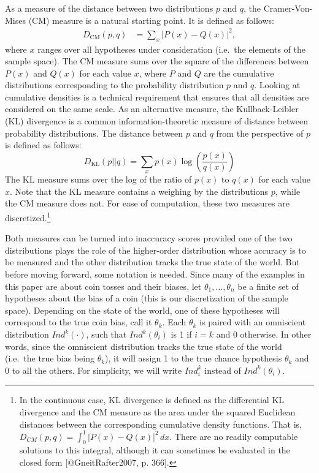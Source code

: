 \documentclass[
  letterpaper,
  DIV=11,
  numbers=noendperiod]{scrartcl}
\begin{document}
As a measure of the distance between two distributions \(p\) and \(q\),
the Cramer-Von-Mises (CM) measure is a natural starting point. It is
defined as follows: \begin{align*}
D_{\text{CM}}(p,q) & = \sum_{x} \vert P(x) - Q(x)\vert^2, 
\end{align*} \noindent where \(x\) ranges over all hypotheses under
consideration (i.e.~the elements of the sample space). The CM measure
sums over the square of the differences between \(P(x)\) and \(Q(x)\)
for each value \(x\), where \(P\) and \(Q\) are the cumulative
distributions corresponding to the probability distribution \(p\) and
\(q\). Looking at cumulative densities is a technical requirement that
ensures that all densities are considered on the same scale. As an
alternative measure, the Kullback-Leibler (KL) divergence is a common
information-theoretic measure of distance between probability
distributions. The distance between \(p\) and \(q\) from the perspective
of \(p\) is defined as follows:
\[ D_{\text{KL}}(p || q) = \sum_{x} p(x) \log\left(\frac{p(x)}{q(x)}\right) \]
\noindent The KL measure sums over the log of the ratio of \(p(x)\) to
\(q(x)\) for each value \(x\). Note that the KL measure contains a
weighing by the distributions \(p\), while the CM measure does not. For
ease of computation, these two measures are discretized.\footnote{In the
  continuous case, KL divergence is defined as the differential KL
  divergence and the CM measure as the area under the squared Euclidean
  distances between the corresponding cumulative density functions. That
  is, \(D_{CM}(p,q)  = \int_{0}^{1} \vert P(x) - Q(x)\vert^2 \, dx\).
  There are no readily computable solutions to this integral, although
  it can sometimes be evaluated in the closed form {[}@GneitRafter2007,
  p. 366{]}.}

Both measures can be turned into inaccuracy scores provided one of the
two distributions plays the role of the higher-order distribution whose
accuracy is to be measured and the other distribution tracks the true
state of the world. But before moving forward, some notation is needed.
Since many of the examples in this paper are about coin tosses and their
biases, let \(\theta_1, \dots, \theta_n\) be a finite set of hypotheses
about the bias of a coin (this is our discretization of the sample
space). Depending on the state of the world, one of these hypotheses
will correspond to the true coin bias, call it \(\theta_k\). Each
\(\theta_k\) is paired with an omniscient distribution \(Ind^k(\cdot)\),
such that \(Ind^k(\theta_i)\) is 1 if \(i=k\) and \(0\) otherwise. In
other words, since the omniscient distribution tracks the true state of
the world (i.e.~the true bias being \(\theta_k\)), it will assign 1 to
the true chance hypothesis \(\theta_k\) and 0 to all the others. For
simplicity, we will write \(Ind^k_i\) instead of \(Ind^k(\theta_i)\).
\end{document}
